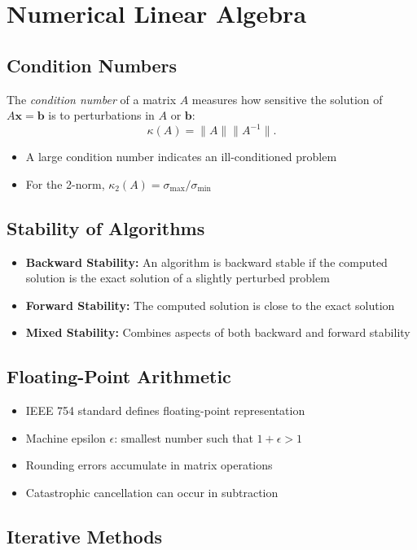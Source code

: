 \section{Numerical Linear Algebra}
\subsection{Condition Numbers}
The \emph{condition number} of a matrix $A$ measures how sensitive the solution of $A\mathbf{x} = \mathbf{b}$ 
is to perturbations in $A$ or $\mathbf{b}$:
\[
\kappa(A) = \|A\| \|A^{-1}\|.
\]
\begin{itemize}
    \item A large condition number indicates an ill-conditioned problem
    \item For the 2-norm, $\kappa_2(A) = \sigma_{\max}/\sigma_{\min}$
\end{itemize}

\subsection{Stability of Algorithms}
\begin{itemize}
    \item \textbf{Backward Stability:} 
          An algorithm is backward stable if the computed solution is the exact solution 
          of a slightly perturbed problem
    \item \textbf{Forward Stability:} 
          The computed solution is close to the exact solution
    \item \textbf{Mixed Stability:} 
          Combines aspects of both backward and forward stability
\end{itemize}

\subsection{Floating-Point Arithmetic}
\begin{itemize}
    \item IEEE 754 standard defines floating-point representation
    \item Machine epsilon $\epsilon$: smallest number such that $1 + \epsilon > 1$
    \item Rounding errors accumulate in matrix operations
    \item Catastrophic cancellation can occur in subtraction
\end{itemize}

\subsection{Iterative Methods}
